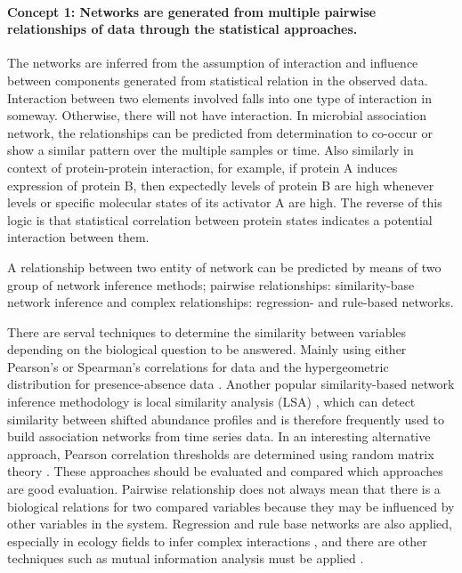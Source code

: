 \paragraph{Concept 1: Networks are generated from multiple pairwise relationships of data through the statistical approaches.} 

The networks are inferred from the assumption of interaction and influence between components generated from statistical relation in the observed data. Interaction between two elements involved falls into one type of interaction in someway. Otherwise, there will not have interaction. In microbial association network, the relationships can be predicted from determination to co-occur or show a similar pattern over the multiple samples or time. Also similarly in context of protein-protein interaction, for example, if protein A induces expression of protein B, then expectedly levels of protein B are high whenever levels or specific molecular states of its activator A are high. The reverse of this logic is that statistical correlation between protein states indicates a potential interaction between them.

A relationship between two entity of network can be predicted by means of two group of network inference methods; pairwise relationships: similarity-base network inference and complex relationships: regression- and rule-based networks. 

There are serval techniques to determine the similarity between variables depending on the biological question to be answered. Mainly using either Pearson's or Spearman's correlations for data  and the hypergeometric distribution for presence-absence data . Another popular similarity-based network inference methodology is local similarity analysis (LSA) , which can detect similarity between shifted abundance profiles and is therefore frequently used to build association networks from time series data. In an interesting alternative approach, Pearson correlation thresholds are determined using random matrix theory . These approaches should be evaluated and compared which approaches are good evaluation. Pairwise relationship does not always mean that there is a biological relations for two compared variables because they may be influenced by other variables in the system. Regression and rule base networks are also applied, especially in ecology fields to infer complex interactions , and there are other techniques such as mutual information analysis must be applied . 

